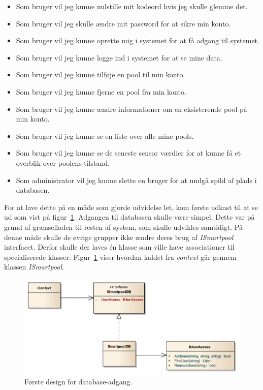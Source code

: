 \begin{itemize}
	\item Som bruger vil jeg kunne nulstille mit kodeord hvis jeg skulle glemme det.
	\item Som bruger vil jeg skulle ændre mit password for at sikre min konto.
	\item Som bruger vil jeg kunne oprette mig i systemet for at få adgang til systemet.
	\item Som bruger vil jeg kunne logge ind i systemet for at se mine data.
	\item Som bruger vil jeg kunne tilføje en pool til min konto.
	\item Som bruger vil jeg kunne fjerne en pool fra min konto.
	\item Som bruger vil jeg kunne ændre informationer om en eksisterende pool på min konto.
	\item Som bruger vil jeg kunne se en liste over alle mine pools.
	\item Som bruger vil jeg kunne se de seneste sensor værdier for at kunne få et overblik over poolens tilstand.
	\item Som administrator vil jeg kunne slette en bruger for at undgå spild af plads i databasen.
\end{itemize}


For at lave dette på en måde som gjorde udvidelse let, kom første udkast til at se ud som vist på figur~\ref{fig:database_class_1}. Adgangen til databasen skulle være simpel. Dette var på grund af grænsefladen til resten af system, som skulle udvikles samtidigt. På denne måde skulle de øvrige grupper ikke ændre deres brug af \textit{ISmartpool} interfacet.  Derfor skulle der laves én klasse som ville have associationer til specialiserede klasser. Figur~\ref{fig:database_class_1} viser hvordan kaldet fra \textit{context} går gennem klassen \textit{ISmartpool}.

\begin{figure}[h]
	\centering
	\includegraphics[width=0.9\linewidth]{figs/design/database_class_1}
	\caption{Første design for database-adgang.}
	\label{fig:database_class_1}
\end{figure}

